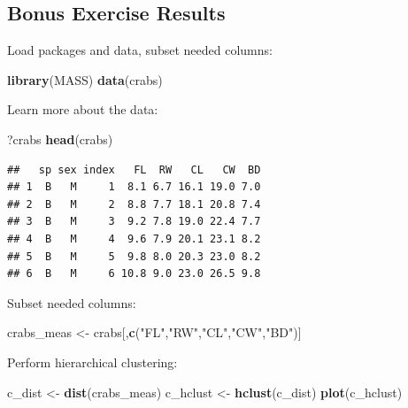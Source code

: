 \documentclass[
]{book}
\newenvironment{Shaded}{\begin{snugshade}}{\end{snugshade}}
\newcommand{\FunctionTok}[1]{\textcolor[rgb]{0.13,0.29,0.53}{\textbf{#1}}}
\newcommand{\NormalTok}[1]{#1}
\newcommand{\OtherTok}[1]{\textcolor[rgb]{0.56,0.35,0.01}{#1}}
\newcommand{\StringTok}[1]{\textcolor[rgb]{0.31,0.60,0.02}{#1}}
\begin{document}
\subsection{Bonus Exercise Results}\label{bonus-exercise-results}

Load packages and data, subset needed columns:

\begin{Shaded}
\begin{Highlighting}[]
\FunctionTok{library}\NormalTok{(MASS)}
\FunctionTok{data}\NormalTok{(crabs)}
\end{Highlighting}
\end{Shaded}

Learn more about the data:

\begin{Shaded}
\begin{Highlighting}[]
\NormalTok{?crabs}
\FunctionTok{head}\NormalTok{(crabs)}
\end{Highlighting}
\end{Shaded}

\begin{verbatim}
##   sp sex index   FL  RW   CL   CW  BD
## 1  B   M     1  8.1 6.7 16.1 19.0 7.0
## 2  B   M     2  8.8 7.7 18.1 20.8 7.4
## 3  B   M     3  9.2 7.8 19.0 22.4 7.7
## 4  B   M     4  9.6 7.9 20.1 23.1 8.2
## 5  B   M     5  9.8 8.0 20.3 23.0 8.2
## 6  B   M     6 10.8 9.0 23.0 26.5 9.8
\end{verbatim}

Subset needed columns:

\begin{Shaded}
\begin{Highlighting}[]
\NormalTok{crabs\_meas }\OtherTok{\textless{}{-}}\NormalTok{  crabs[,}\FunctionTok{c}\NormalTok{(}\StringTok{"FL"}\NormalTok{,}\StringTok{"RW"}\NormalTok{,}\StringTok{"CL"}\NormalTok{,}\StringTok{"CW"}\NormalTok{,}\StringTok{"BD"}\NormalTok{)]}
\end{Highlighting}
\end{Shaded}

Perform hierarchical clustering:

\begin{Shaded}
\begin{Highlighting}[]
\NormalTok{c\_dist }\OtherTok{\textless{}{-}} \FunctionTok{dist}\NormalTok{(crabs\_meas)}
\NormalTok{c\_hclust }\OtherTok{\textless{}{-}} \FunctionTok{hclust}\NormalTok{(c\_dist)}
\FunctionTok{plot}\NormalTok{(c\_hclust)}
\end{Highlighting}
\end{Shaded}
\end{document}
